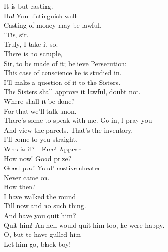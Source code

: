 \documentclass[a4paper,oneside,12pt]{memoir}
\begin{document}
\begin{drama*}
It is but casting.\\
\tribulationspeaks {} Ha! You distinguish well:\\
Casting of money may be lawful.\\
\persecutionspeaks {} 'Tis, sir.\\
\tribulationspeaks Truly, I take it so.\\
\subtlespeaks {} There is no scruple,\\
Sir, to be made of it; believe Persecution:\\
This case of conscience he is studied in.\\
\tribulationspeaks I'll make a question of it to the Sisters.\\
\persecutionspeaks The Sisters shall approve it lawful, doubt not.\\
Where shall it be done?\\
\subtlespeaks {} For that we'll talk anon.\\
There's some to speak with me. Go in, I pray you,\\
And view the parcels. That's the inventory.\\
I'll come to you straight.\\
 Who is it?---Face! Appear.\\
How now! Good prize?\\
\facespeaks {} Good pox! Yond' costive cheater\\
Never came on.\\
\subtlespeaks {} How then?\\
\facespeaks {} I have walked the round\\
Till now and no such thing.\\
\subtlespeaks {} And have you quit him?\\
\facespeaks Quit him! An hell would quit him too, he were happy.\\
\subtlespeaks O, but to have gulled him---\\
\facespeaks {} Let him go, black boy!\\

\end{drama*}
\end{document}
